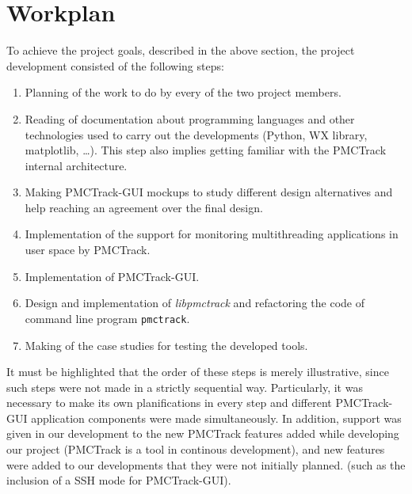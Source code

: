 \section{Workplan}\label{workplan}

To achieve the project goals, described in the above section, the
project development consisted of the following steps:

\begin{enumerate}
\def\labelenumi{\arabic{enumi}.}
\itemsep1pt\parskip0pt
\item
  Planning of the work to do by every of the two project members.
\item
  Reading of documentation about programming languages and other
  technologies used to carry out the developments (Python, WX library,
  matplotlib, \ldots). This step also implies getting familiar with the
  PMCTrack internal architecture.
\item
  Making PMCTrack-GUI mockups to study different design alternatives and
  help reaching an agreement over the final design.
\item
  Implementation of the support for monitoring multithreading
  applications in user space by PMCTrack.
\item
  Implementation of PMCTrack-GUI.
\item
  Design and implementation of \emph{libpmctrack} and refactoring the
  code of command line program \texttt{pmctrack}.
\item
  Making of the case studies for testing the developed tools.
\end{enumerate}

It must be highlighted that the order of these steps is merely
illustrative, since such steps were not made in a strictly sequential
way. Particularly, it was necessary to make its own planifications in
every step and different PMCTrack-GUI application components were made
simultaneously. In addition, support was given in our development to the
new PMCTrack features added while developing our project (PMCTrack is a
tool in continous development), and new features were added to our
developments that they were not initially planned. (such as the
inclusion of a SSH mode for PMCTrack-GUI). 
